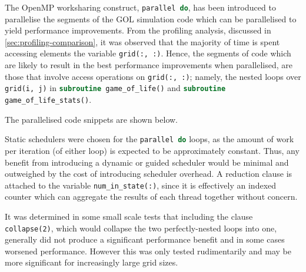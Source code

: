 \documentclass[]{article}
\begin{document}
The OpenMP worksharing construct, \lstinline[language=Fortran]{parallel do}, has
been introduced to parallelise the segments of the GOL simulation code which can
be parallelised to yield performance improvements.
From the profiling analysis, discussed in \autoref{sec:profiling-comparison}, it
was observed that the majority of time is spent accessing elements the variable
\lstinline[language=Fortran]{grid(:, :)}.
Hence, the segments of code which are likely to result in the best performance
improvements when parallelised, are those that involve access operations on
\lstinline[language=Fortran]{grid(:, :)}; namely, the nested loops over
\lstinline[language=Fortran]{grid(i, j)} in
\lstinline[language=Fortran]{subroutine game_of_life()} and
\lstinline[language=Fortran]{subroutine game_of_life_stats()}.

The parallelised code snippets are shown below.





Static schedulers were chosen for the \lstinline[language=Fortran]{parallel do}
loops, as the amount of work per iteration (of either loop) is expected to be
approximately constant.
Thus, any benefit from introducing a dynamic or guided scheduler would be
minimal and outweighed by the cost of introducing scheduler overhead.
A reduction clause is attached to the variable
\lstinline[language=Fortran]{num_in_state(:)}, since it is effectively an
indexed counter which can aggregate the results of each thread together without
concern.

It was determined in some small scale tests that including the clause
\lstinline{collapse(2)}, which would collapse the two perfectly-nested loops
into one, generally did not produce a significant performance benefit and in
some cases worsened performance.
However this was only tested rudimentarily and may be more significant for
increasingly large grid sizes.
\end{document}
